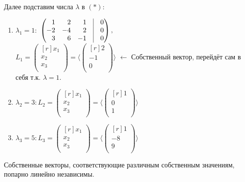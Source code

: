 Далее подставим числа $\lambda$ в $(*)$:

\begin{enumerate}
\item{
$\lambda_1=1 :$
$\begin{pmatrix*}[r]
 1 & 2 & 1 & \vrule & 0\\
 -2 & -4 & 2 & \vrule & 0\\
 3 & 6 & -1 & \vrule & 0\\
\end{pmatrix*} , $\\
$
L_1=
\left(
\begin{smallmatrix*}[r]
x_1\\ x_2\\ x_3\\ 
\end{smallmatrix*}
\right) 
=
\langle
\left(
\begin{smallmatrix*}[r]
2\\ -1\\ 0\\ 
\end{smallmatrix*}
\right) 
\rangle
$
$\leftarrow $
 Собственный вектор, перейдёт сам в себя т.к. $\lambda=1$.
}
\item{
$\lambda_2=3 :
L_2=
\left(
\begin{smallmatrix*}[r]
x_1\\ x_2\\ x_3\\ 
\end{smallmatrix*}
\right) 
=
\langle
\left(
\begin{smallmatrix*}[r]
1\\ 0\\ 1\\ 
\end{smallmatrix*}
\right) 
\rangle
$
}
\item{
$\lambda_3=5 :
L_3=
\left(
\begin{smallmatrix*}[r]
x_1\\ x_2\\ x_3\\ 
\end{smallmatrix*}
\right) 
=
\langle
\left(
\begin{smallmatrix*}[r]
1\\ -8\\ 9\\ 
\end{smallmatrix*}
\right) 
\rangle
$
}
\end{enumerate}

\begin{lemma} %
	Собственные векторы, соответствующие различным собственным значениям, попарно линейно независимы.
\end{lemma}


